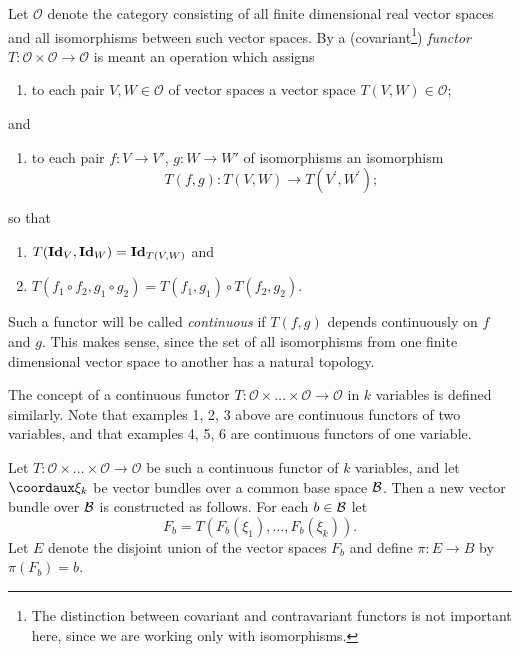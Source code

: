\begin{definition}\label{def:3-4}
	Let $\mathcal{O}$ denote the category consisting of all finite dimensional real
	vector spaces and all isomorphisms between such vector spaces. By a
	(covariant\footnote{The distinction between covariant and contravariant functors is not important
		here, since we are working only with isomorphisms.}) \textit{functor} $T \mathpunct{:} \mathcal{O}\times\mathcal{O} \to \mathcal{O}$ is meant an operation which assigns
	\begin{enumerate}[label=\arabic*),leftmargin=2\parindent ]
		\item to each pair $V, W\in \mathcal{O}$ of vector spaces a vector space $T(V, W)\in\mathcal{O}$;
	\end{enumerate}
	and
	\begin{enumerate}[label=\arabic*),leftmargin=2\parindent,resume ]
		\item to each pair $f\mathpunct{:} V \to V'$, $g \mathpunct{:} W \to W'$ of isomorphisms an isomorphism
		\[T(f, g): T(V, W) \rightarrow T\left(V^{\prime}, W^{\prime}\right);\]
	\end{enumerate}
	so that
	\begin{enumerate}[label=\arabic*),leftmargin=2\parindent,resume ]
		\item $T(\mathbf{Id}_V,\mathbf{Id}_W)=\mathbf{Id}_{T(V,W)}$ and
		\item $T\left(f_{1} \circ f_{2}, g_{1} \circ g_{2}\right)=T\left(f_{1}, g_{1}\right) \circ T\left(f_{2}, g_{2}\right)$.
	\end{enumerate}
Such a functor will be called \textit{continuous} if $T(f, g)$ depends continuously
on $f$ and $g$. This makes sense, since the set of all isomorphisms from
one finite dimensional vector space to another has a natural topology.
\end{definition}

The concept of a continuous functor $T\mathpunct{:}\mathcal{O}\times\dots\times\mathcal{O}\to\mathcal{O}$ in $k$ variables
is defined similarly. Note that examples 1, 2, 3 above are continuous
functors of two variables, and that examples 4, 5, 6 are continuous 
functors of one variable.

Let $T\mathpunct{:}\mathcal{O}\times\dots\times\mathcal{O}\to\mathcal{O}$ be such a continuous functor of $k$ variables,
and let $\coord{\xi_k}$ be vector bundles over a common base space $\mathcal{B}$. Then
a new vector bundle over $\mathcal{B}$ is constructed as follows. For each $b\in \mathcal{B}$ let
\[F_{b}=T\left(F_{b}\left(\xi_{1}\right), \ldots, F_{b}\left(\xi_{k}\right)\right).\]
Let $E$ denote the disjoint union of the vector spaces $F_b$ and define
$\pi\mathpunct{:}E\to B$ by $\pi(F_b) = b$.

